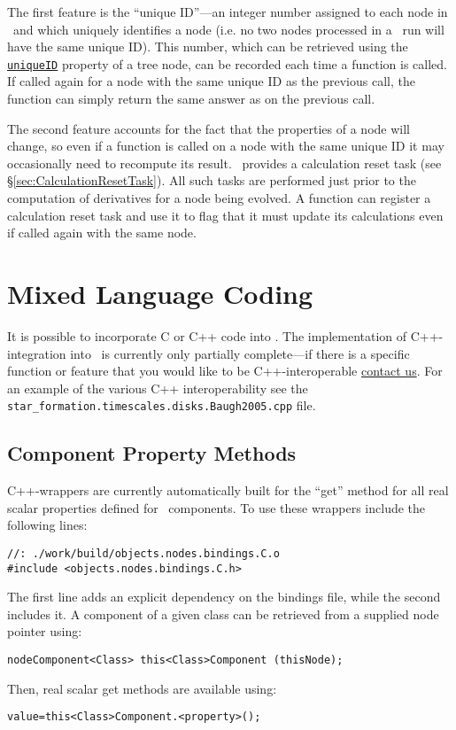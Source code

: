 The first feature is the ``unique ID''---an integer number assigned to each node in \glc\ and which uniquely identifies a node (i.e. no two nodes processed in a \glc\ run will have the same unique ID). This number, which can be retrieved using the \href{method:uniqueID}{{\tt uniqueID}} property of a tree node, can be recorded each time a function is called. If called again for a node with the same unique ID as the previous call, the function can simply return the same answer as on the previous call.

The second feature accounts for the fact that the properties of a node will change, so even if a function is called on a node with the same unique ID it may occasionally need to recompute its result. \glc\ provides a calculation reset task (see \S\ref{sec:CalculationResetTask}). All such tasks are performed just prior to the computation of derivatives for a node being evolved. A function can register a calculation reset task and use it to flag that it must update its calculations even if called again with the same node.

\section{Mixed Language Coding}\label{sec:MixedLanguageCoding}

It is possible to incorporate C or C++ code into \glc. The implementation of C++-integration into \glc\ is currently only partially complete---if there is a specific function or feature that you would like to be C++-interoperable \href{mailto:abenson@obs.carnegiescience.edu}{contact us}. For an example of the various C++ interoperability see the {\tt star\_formation.timescales.disks.Baugh2005.cpp} file.

\subsection{Component Property Methods}

C++-wrappers are currently automatically built for the ``get'' method for all real scalar properties defined for \glc\ components. To use these wrappers include the following lines:
\begin{verbatim}
//: ./work/build/objects.nodes.bindings.C.o
#include <objects.nodes.bindings.C.h>
\end{verbatim}
The first line adds an explicit dependency on the bindings file, while the second includes it. A component of a given class can be retrieved from a supplied node pointer using:
\begin{verbatim}
nodeComponent<Class> this<Class>Component (thisNode);
\end{verbatim}
Then, real scalar get methods are available using:
\begin{verbatim}
value=this<Class>Component.<property>();
\end{verbatim}

